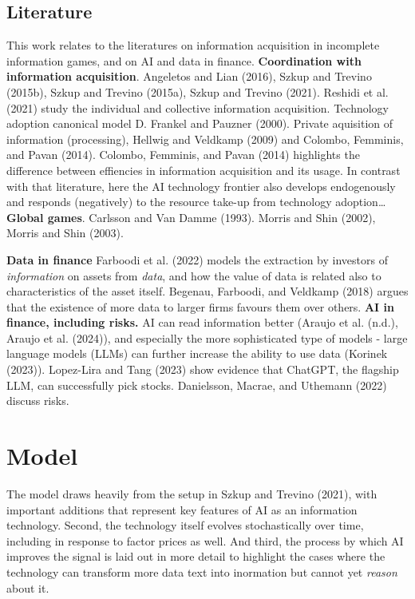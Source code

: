 \documentclass[
]{article}
\theoremstyle{plain}
\theoremstyle{remark}
\begin{document}
\subsection{Literature}\label{literature}

This work relates to the literatures on information acquisition in
incomplete information games, and on AI and data in finance.
\textbf{Coordination with information acquisition}. Angeletos and Lian
(2016), Szkup and Trevino (2015b), Szkup and Trevino (2015a), Szkup and
Trevino (2021). Reshidi et al. (2021) study the individual and
collective information acquisition. Technology adoption canonical model
D. Frankel and Pauzner (2000). Private aquisition of information
(processing), Hellwig and Veldkamp (2009) and Colombo, Femminis, and
Pavan (2014). Colombo, Femminis, and Pavan (2014) highlights the
difference between effiencies in information acquisition and its usage.
In contrast with that literature, here the AI technology frontier also
develops endogenously and responds (negatively) to the resource take-up
from technology adoption\ldots{} \textbf{Global games}. Carlsson and Van
Damme (1993). Morris and Shin (2002), Morris and Shin (2003).

\textbf{Data in finance} Farboodi et al. (2022) models the extraction by
investors of \emph{information} on assets from \emph{data}, and how the
value of data is related also to characteristics of the asset itself.
Begenau, Farboodi, and Veldkamp (2018) argues that the existence of more
data to larger firms favours them over others. \textbf{AI in finance,
including risks.} AI can read information better (Araujo et al. (n.d.),
Araujo et al. (2024)), and especially the more sophisticated type of
models - large language models (LLMs) can further increase the ability
to use data (Korinek (2023)). Lopez-Lira and Tang (2023) show evidence
that ChatGPT, the flagship LLM, can successfully pick stocks.
Danielsson, Macrae, and Uthemann (2022) discuss risks.

\section{Model}\label{model}

The model draws heavily from the setup in Szkup and Trevino (2021), with
important additions that represent key features of AI as an information
technology. Second, the technology itself evolves stochastically over
time, including in response to factor prices as well. And third, the
process by which AI improves the signal is laid out in more detail to
highlight the cases where the technology can transform more data text
into inormation but cannot yet \emph{reason} about it.
\end{document}
